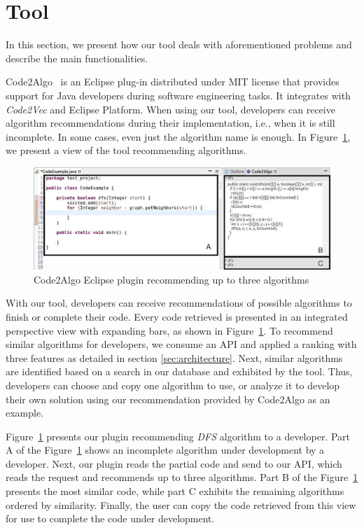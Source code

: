\documentclass[12pt]{article}
\begin{document}
\section {Tool}
\label{sec:tool}

    In this section, we present how our tool deals with aforementioned problems and describe the main functionalities. 
    
    Code2Algo~\cite{Code2Algo2019} is an Eclipse plug-in distributed under MIT license that provides support for Java developers during software engineering tasks. It integrates with \textit{Code2Vec} and Eclipse Platform. When using our tool, developers can receive algorithm recommendations during their implementation, i.e., when it is still incomplete. In some cases, even just the algorithm name is enough. In Figure~\ref{fig:recommender}, we present a view of the tool recommending algorithms.  
    
    \begin{figure}[h]
        \centering
        \includegraphics[width=\linewidth]{cbsoft19/figs/Exemplo.jpg}
        \caption{Code2Algo Eclipse plugin recommending up to three algorithms}
        \label{fig:recommender}
    \end{figure}
    
    With our tool, developers can receive recommendations of possible algorithms to finish or complete their code. Every code retrieved is presented in an integrated perspective view with expanding bars, as shown in Figure~\ref{fig:recommender}. To recommend similar algorithms for developers, we consume an API and applied a ranking with three features as detailed in section \ref{sec:architecture}. Next, similar algorithms are identified based on a search in our database and exhibited by the tool. Thus, developers can choose and copy one algorithm to use, or analyze it to develop their own solution using our recommendation provided by Code2Algo as an example.

    Figure~\ref{fig:recommender} presents our plugin recommending \textit{DFS} algorithm to a developer. Part A of the Figure~\ref{fig:recommender} shows an incomplete algorithm under development by a developer. Next, our plugin reads the partial code and send to our API, which reads the request and recommends up to three algorithms. Part B of the  Figure~\ref{fig:recommender} presents the most similar code, while part C exhibits the remaining algorithms ordered by similarity. Finally, the user can copy the code retrieved from this view for use to complete the code under development. 
    
\end{document}
